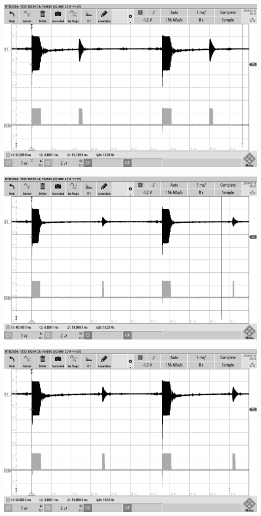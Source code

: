 \begin{minipage}{0.5\textwidth}
\includegraphics[width=1\textwidth%
]{Abbildungen/MessungenP2/10V/2m.PNG}
\end{minipage}
\begin{minipage}{0.5\textwidth}
\includegraphics[width=1\textwidth%
]{Abbildungen/MessungenP2/5V/3m.PNG}
\end{minipage}
\begin{minipage}{0.5\textwidth}
\includegraphics[width=1\textwidth%
]{Abbildungen/MessungenP2/10V/3m.PNG}
\end{minipage}

